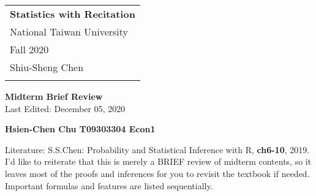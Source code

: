 \documentclass[a4paper,12pt]{article} %
\begin{document}
\thispagestyle{empty}
\begin{tabular}{p{15.5cm}} %
{\large \bf Statistics with Recitation} \\ National Taiwan University \\ Fall 2020 \\ Shiu-Sheng Chen \\ %
\hline %
\\
\end{tabular} %

\vspace*{0.3cm}
\begin{center}
    {\Large \bf Midterm Brief Review} 
    \\
    Last Edited: December 05, 2020
	\vspace{2mm}
	
	{\bf Hsien-Chen Chu T09303304 Econ1} %
\end{center}
\vspace{0.4cm}

Literature: S.S.Chen: Probability and Statistical Inference with R, {\bf ch6-10}, 2019. \\
I'd like to reiterate that this is merely a BRIEF review of midterm contents, so it leaves most of the proofs and inferences for you to revisit the textbook if needed.\\ Important formulas and features are listed sequentially. 
\end{document}

